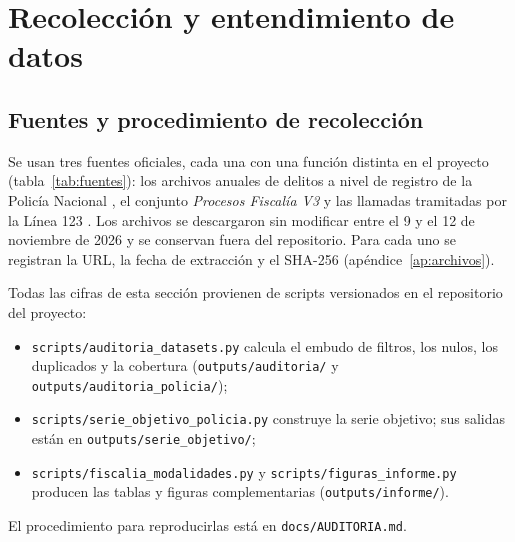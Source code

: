 
\section{Recolección y entendimiento de datos}\label{sec:datos}

\subsection{Fuentes y procedimiento de recolección}

Se usan tres fuentes oficiales, cada una con una función distinta en el proyecto (tabla~\ref{tab:fuentes}): los archivos anuales de delitos a nivel de registro de la Policía Nacional \citep{policia}, el conjunto \emph{Procesos Fiscalía V3} \citep{fiscalia} y las llamadas tramitadas por la Línea 123 \citep{linea123}. Los archivos se descargaron sin modificar entre el 9 y el 12 de noviembre de 2026 y se conservan fuera del repositorio. Para cada uno se registran la URL, la fecha de extracción y el SHA-256 (apéndice~\ref{ap:archivos}).

Todas las cifras de esta sección provienen de scripts versionados en el repositorio del proyecto:
\begin{itemize}
  \item \texttt{scripts/auditoria\_datasets.py} calcula el embudo de filtros, los nulos, los duplicados y la cobertura (\texttt{outputs/auditoria/} y \texttt{outputs/auditoria\_policia/});
  \item \texttt{scripts/serie\_objetivo\_policia.py} construye la serie objetivo; sus salidas están en \texttt{outputs/serie\_objetivo/};
  \item \texttt{scripts/fiscalia\_modalidades.py} y \texttt{scripts/figuras\_informe.py} producen las tablas y figuras complementarias (\texttt{outputs/informe/}).
\end{itemize}
El procedimiento para reproducirlas está en \texttt{docs/AUDITORIA.md}.

